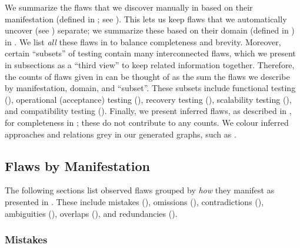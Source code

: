 We summarize the flaws that we discover manually in  based on
their manifestation (defined in \ifnotpaper; see
\fi). This lets us keep flaws that we automatically
uncover \ifnotpaper (see ) \fi separate; we summarize
these based on their domain (defined in ) in .
\ifnotpaper We list \emph{all} these flaws in  to balance
    completeness and brevity. \fi Moreover, certain ``subsets'' of testing
contain many interconnected flaws, which we present in subsections as a
``third view'' to keep related information together. Therefore, the counts of
flaws given in  can be thought of as the sum
the flaws we describe by manifestation, domain, and ``subset''. These subsets
include functional testing (), \ifnotpaper operational
    (acceptance) testing (), \fi recovery testing
(), scalability testing (), and compatibility
testing (). \ifnotpaper Finally, we present inferred flaws,
    as described in , for completeness in ;
    these do not contribute to any counts.
    We colour inferred approaches and relations grey in our generated graphs,
    such as \recFigs{}.


    \begin{landscape}
        \flawMnfstsTable{}
        \flawDmnsTable{}
    \end{landscape}

\fi

\subsection{Flaws by Manifestation}\label{flawMnfsts}

The following sections list observed flaws grouped by \emph{how} they manifest
as presented in . These include mistakes (),
omissions (), contradictions (), ambiguities
(), overlaps (), and redundancies ().

\subsubsection{Mistakes}\label{wrong}

